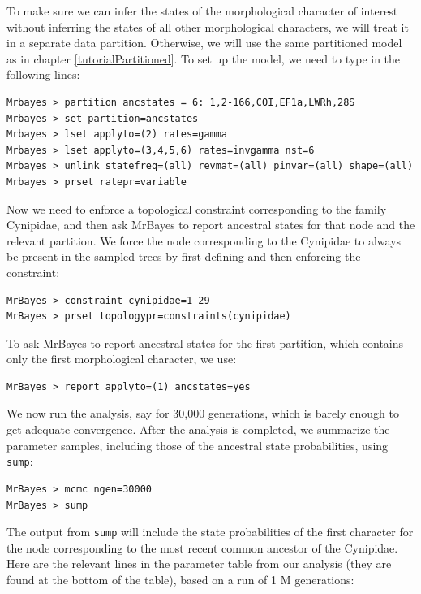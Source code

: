 \documentclass[12pt]{book}
\begin{document}
To make sure we can infer the states of the morphological character of interest without inferring
the states of all other morphological characters, we will treat it in a separate data partition.
Otherwise, we will use the same partitioned model as in chapter \ref{tutorialPartitioned}. To set
up the model, we need to type in the following lines:

\begin{Verbatim}
Mrbayes > partition ancstates = 6: 1,2-166,COI,EF1a,LWRh,28S
Mrbayes > set partition=ancstates
Mrbayes > lset applyto=(2) rates=gamma
Mrbayes > lset applyto=(3,4,5,6) rates=invgamma nst=6
Mrbayes > unlink statefreq=(all) revmat=(all) pinvar=(all) shape=(all)
Mrbayes > prset ratepr=variable
\end{Verbatim}

Now we need to enforce a topological constraint corresponding to the family Cynipidae, and then ask
MrBayes to report ancestral states for that node and the relevant partition. We force the node
corresponding to the Cynipidae to always be present in the sampled trees by first defining and then
enforcing the constraint:

\begin{Verbatim}
MrBayes > constraint cynipidae=1-29
MrBayes > prset topologypr=constraints(cynipidae)
\end{Verbatim}

To ask MrBayes to report ancestral states for the first partition, which contains only the first
morphological character, we use:

\begin{Verbatim}
MrBayes > report applyto=(1) ancstates=yes
\end{Verbatim}

We now run the analysis, say for 30,000 generations, which is barely enough to get adequate
convergence. After the analysis is completed, we summarize the parameter samples, including those
of the ancestral state probabilities, using \texttt{sump}:

\begin{Verbatim}
MrBayes > mcmc ngen=30000
MrBayes > sump
\end{Verbatim}

The output from \texttt{sump} will include the state probabilities of the first character for the
node corresponding to the most recent common ancestor of the Cynipidae. Here are the relevant lines
in the parameter table from our analysis (they are found at the bottom of the table), based on a
run of 1 M generations:
\end{document}
